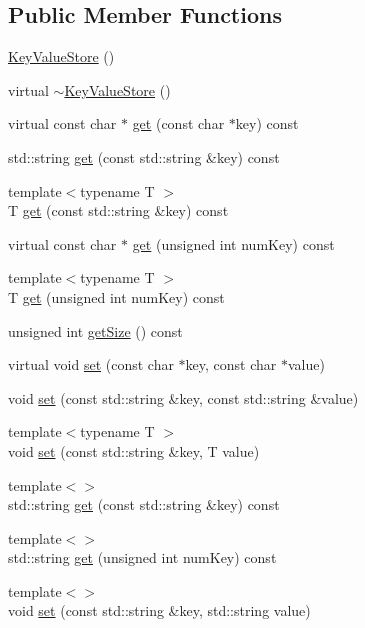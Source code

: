 \subsection*{Public Member Functions}
\begin{DoxyCompactItemize}
\item 
\hyperlink{classmaudio_1_1KeyValueStore_a911ecf87816cdd00069de47a65b278c0}{Key\-Value\-Store} ()
\item 
virtual \hyperlink{classmaudio_1_1KeyValueStore_a3f5df2ca00a9e508398aa4fb3ac6498c}{$\sim$\-Key\-Value\-Store} ()
\item 
virtual const char $\ast$ \hyperlink{classmaudio_1_1KeyValueStore_a21db38aeef23adde09a22eea9e85ab71}{get} (const char $\ast$key) const 
\item 
std\-::string \hyperlink{classmaudio_1_1KeyValueStore_aac44d807fbcbbda2b2b555f673e3ed7f}{get} (const std\-::string \&key) const 
\item 
{\footnotesize template$<$typename T $>$ }\\T \hyperlink{classmaudio_1_1KeyValueStore_a4541b1c74b932532f450044e1a417ebd}{get} (const std\-::string \&key) const 
\item 
virtual const char $\ast$ \hyperlink{classmaudio_1_1KeyValueStore_a0c19dbb4603a13e45d4c6a8c8b085758}{get} (unsigned int num\-Key) const 
\item 
{\footnotesize template$<$typename T $>$ }\\T \hyperlink{classmaudio_1_1KeyValueStore_aaafd70f76ca552d5c221414cfb5f49cc}{get} (unsigned int num\-Key) const 
\item 
unsigned int \hyperlink{classmaudio_1_1KeyValueStore_acb51935ff31c59168f72be8af784433a}{get\-Size} () const 
\item 
virtual void \hyperlink{classmaudio_1_1KeyValueStore_a85374af3b968a7bfe7e3e11a9a228375}{set} (const char $\ast$key, const char $\ast$value)
\item 
void \hyperlink{classmaudio_1_1KeyValueStore_a8103b4641569199ed0c6c52796c48354}{set} (const std\-::string \&key, const std\-::string \&value)
\item 
{\footnotesize template$<$typename T $>$ }\\void \hyperlink{classmaudio_1_1KeyValueStore_a8ec3ac184592273483aba5d601613a90}{set} (const std\-::string \&key, T value)
\item 
{\footnotesize template$<$$>$ }\\std\-::string \hyperlink{classmaudio_1_1KeyValueStore_a30cac1374ed8dd15ed1d7398078002e0}{get} (const std\-::string \&key) const 
\item 
{\footnotesize template$<$$>$ }\\std\-::string \hyperlink{classmaudio_1_1KeyValueStore_a5c9e0d1599466bd7895d87a587e1d909}{get} (unsigned int num\-Key) const 
\item 
{\footnotesize template$<$$>$ }\\void \hyperlink{classmaudio_1_1KeyValueStore_a95fbeceb2aa43a23c7aead64a5d74a2d}{set} (const std\-::string \&key, std\-::string value)
\end{DoxyCompactItemize}
